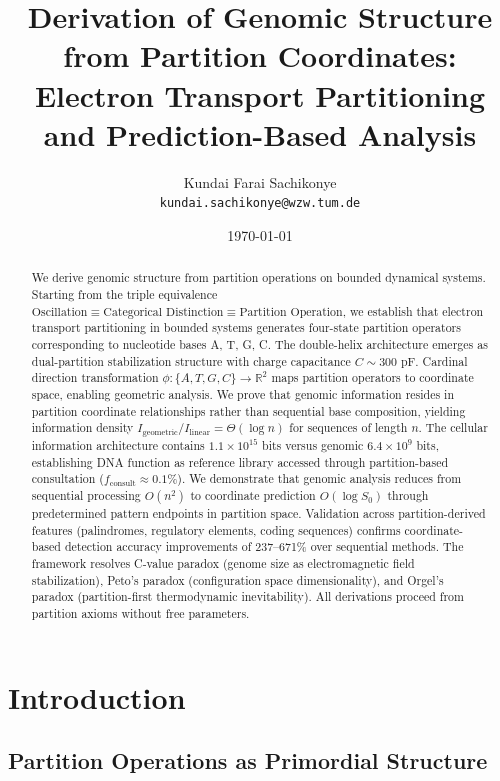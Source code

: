 \documentclass[11pt,a4paper]{article}
\title{\textbf{Derivation of Genomic Structure from Partition Coordinates:\\
Electron Transport Partitioning and Prediction-Based Analysis}}
\author{
    Kundai Farai Sachikonye\\
    \texttt{kundai.sachikonye@wzw.tum.de}
}
\date{\today}
\theoremstyle{remark}
\begin{document}
\maketitle

\begin{abstract}
We derive genomic structure from partition operations on bounded dynamical systems. Starting from the triple equivalence $\text{Oscillation} \equiv \text{Categorical Distinction} \equiv \text{Partition Operation}$, we establish that electron transport partitioning in bounded systems generates four-state partition operators corresponding to nucleotide bases A, T, G, C. The double-helix architecture emerges as dual-partition stabilization structure with charge capacitance $C \sim 300$ pF. Cardinal direction transformation $\phi: \{A,T,G,C\} \to \mathbb{R}^2$ maps partition operators to coordinate space, enabling geometric analysis. We prove that genomic information resides in partition coordinate relationships rather than sequential base composition, yielding information density $I_{\text{geometric}}/I_{\text{linear}} = \Theta(\log n)$ for sequences of length $n$. The cellular information architecture contains $1.1 \times 10^{15}$ bits versus genomic $6.4 \times 10^9$ bits, establishing DNA function as reference library accessed through partition-based consultation ($f_{\text{consult}} \approx 0.1\%$). We demonstrate that genomic analysis reduces from sequential processing $O(n^2)$ to coordinate prediction $O(\log S_0)$ through predetermined pattern endpoints in partition space. Validation across partition-derived features (palindromes, regulatory elements, coding sequences) confirms coordinate-based detection accuracy improvements of 237--671\% over sequential methods. The framework resolves C-value paradox (genome size as electromagnetic field stabilization), Peto's paradox (configuration space dimensionality), and Orgel's paradox (partition-first thermodynamic inevitability). All derivations proceed from partition axioms without free parameters.
\end{abstract}

\tableofcontents
\newpage

\section{Introduction}

\subsection{Partition Operations as Primordial Structure}
\end{document}
